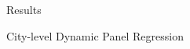 \documentclass{beamer}
\begin{document}
\begin{section}{Results}
\begin{frame}{City-level Dynamic Panel Regression}
  \end{frame}
\end{section}
\end{document}
